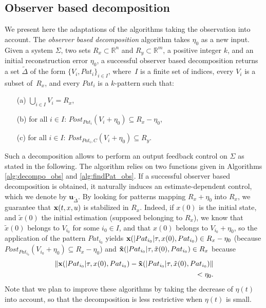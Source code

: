 \subsection{Observer based decomposition}

We present here the adaptations of the algorithms taking the observation into account.
The {\em observer based decomposition} algorithm takes $\eta_0$ as a new input.
Given a system $\Sigma$, two sets $R_x \subset \mathbb{R}^n$ and
$R_y \subset \mathbb{R}^m$,
a positive integer $k$, and an initial reconstruction error $\eta_0$, a  
successful observer based decomposition
returns a set $ \tilde \Delta$
of the form $\{V_i,Pat_i\}_{i \in I}$, where~$I$ is a finite set of indices, every $V_i$ 
is a subset of~$R_x$, and every $Pat_i$ is a $k$-pattern such that:
\begin{itemize}
\item[(a)] $\bigcup_{i \in I}V_i = R_x$,
\item[(b)] for all $i \in I$: $Post_{Pat_i}(V_i + \eta_0) \subseteq R_x - \eta_0$,
\item[(c)] for all $i \in I$: $Post_{Pat_i,C}(V_i + \eta_0) \subseteq R_y$.
\end{itemize}




Such a decomposition allows to perform an output feedback control on $\Sigma$ as 
stated in the following.
The algorithm relies on two functions given in 
Algorithms \ref{alg:decompo_obs} and \ref{alg:findPat_obs}.
If a successful observer based decomposition is obtained, it naturally induces an
estimate-dependent control, which we denote by $\mathbf{u}_{\tilde \Delta}$.
By looking for patterns mapping $R_x + \eta_0$ into $R_x$, we guarantee that 
${\bf x}(t,x,u)$ is stabilized in $R_x$. 
Indeed, if $x(0)$ is the initial state, and $\tilde x(0)$ the initial estimation (supposed belonging to
$R_x$), we know that $\tilde x(0)$ belongs to $V_{i_0}$ for some $i_0 \in I$, 
and that $x(0)$ belongs to $V_{i_0}+\eta_0$,
so the application of the pattern $Pat_{i_0}$ yields ${\bf x}(\vert Pat_{i_0} \vert \tau,x(0),Pat_{i_0}) \in R_x -\eta_0$ (because $Post_{Pat_{i_0}}(V_{i_0} + \eta_0) \subseteq R_x -\eta_0$)
and ${\bf \tilde x}(\vert Pat_{i_0} \vert \tau,\tilde x(0),Pat_{i_0}) \in R_x$ because 
\[\begin{aligned} \Vert {\bf x}(\vert Pat_{i_0} \vert \tau,x(0),Pat_{i_0}) - {\bf \tilde x}(\vert Pat_{i_0} \vert \tau,\tilde x(0),Pat_{i_0}) \Vert & \\ < \eta_0.& \end{aligned}\]
Note that we plan to improve these algorithms by taking the decrease of $\eta(t)$ into account, 
so that the decomposition is less restrictive when $\eta(t)$ is small.

